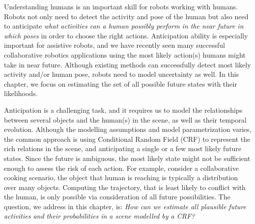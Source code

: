\label{intro}
Understanding humans is an important skill for robots working with humans. Robots not only need to detect the activity and pose of the human but also need to anticipate \emph{what activities can a human possibly perform in the near future in which poses} in order to choose the right actions. Anticipation ability is especially important for assistive robots, and we have recently seen many successful collaborative robotics applications \cite{collob1,collob2,hemaISER} using the most likely action(s) humans might take in near future. Although existing methods can successfully detect most likely activity and/or human pose, robots need to model uncertainty as well. In this chapter, we focus on estimating the set of all possible future states with their likelihoods.


Anticipation is a challenging task, and it requires us to model the relationships between several objects and the human(s) in the scene, as well as their temporal evolution. Although the modelling assumptions and model parametrization varies, the common approach \cite{hemaAnt,gpcrf,hemaECCV,tian} is using Conditional Random Field (CRF) to represent the rich relations in the scene, and anticipating a single or a few most likely future states. Since the future is ambiguous, the most likely state might not be sufficient enough to assess the risk of each action. For example, consider a collaborative cooking scenario, the object that human is reaching is typically a distribution over many objects. Computing the trajectory, that is least likely to conflict with the human, is only possible via consideration of all future possibilities. The question, we address in this chapter, is: \emph{How can we estimate all plausible future activities and their probabilities in a scene modelled by a CRF?}




